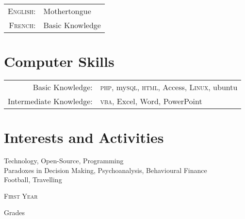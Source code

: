 \documentclass[a4paper,10pt]{article} %
\begin{document}
{\begin{tabular}{rl}
\textsc{English:} & Mothertongue\\
\textsc{French:} & Basic Knowledge\\

\end{tabular}
\section{Computer Skills}
\begin{tabular}{rl}

Basic Knowledge: & \textsc{php}, my\textsc{sql}, \textsc{html}, Access, \textsc{Linux}, ubuntu\\
Intermediate Knowledge: & \textsc{vba}, Excel, Word, PowerPoint\\

\end{tabular}
\section{Interests and Activities}

Technology, Open-Source, Programming\\
Paradoxes in Decision Making, Psychoanalysis, Behavioural Finance\\
Football, Travelling
\par{\centering\Large {\textsc{First Year}}
\par}\large{\centering Grades\par}\normalsize

\begin{center}
\begin{tabular}{lcc}


\end{tabular}
\end{center}}
\end{document}
